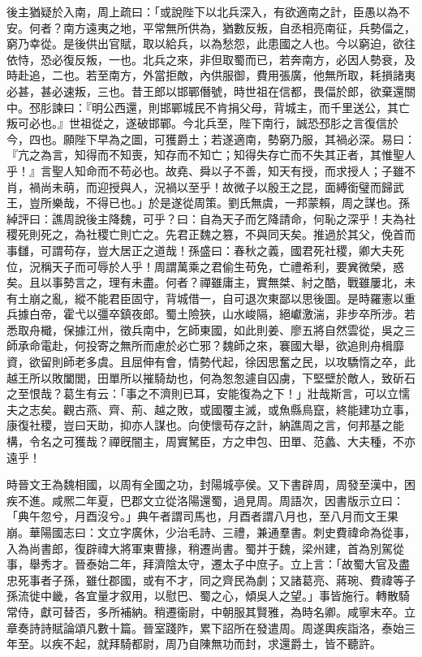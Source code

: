 \begin{pinyinscope}
後主猶疑於入南，周上疏曰：「或說陛下以北兵深入，有欲適南之計，臣愚以為不安。何者？南方遠夷之地，平常無所供為，猶數反叛，自丞相亮南征，兵勢偪之，窮乃幸從。是後供出官賦，取以給兵，以為愁怨，此患國之人也。今以窮迫，欲往依恃，恐必復反叛，一也。北兵之來，非但取蜀而已，若奔南方，必因人勢衰，及時赴追，二也。若至南方，外當拒敵，內供服御，費用張廣，他無所取，耗損諸夷必甚，甚必速叛，三也。昔王郎以邯鄲僭號，時世祖在信都，畏偪於郎，欲棄還關中。邳肜諫曰：『明公西還，則邯鄲城民不肯捐父母，背城主，而千里送公，其亡叛可必也。』世祖從之，遂破邯鄲。今北兵至，陛下南行，誠恐邳肜之言復信於今，四也。願陛下早為之圖，可獲爵土；若遂適南，勢窮乃服，其禍必深。易曰：『亢之為言，知得而不知喪，知存而不知亡；知得失存亡而不失其正者，其惟聖人乎！』言聖人知命而不苟必也。故堯、舜以子不善，知天有授，而求授人；子雖不肖，禍尚未萌，而迎授與人，況禍以至乎！故微子以殷王之昆，面縛銜璧而歸武王，豈所樂哉，不得已也。」於是遂從周策。劉氏無虞，一邦蒙賴，周之謀也。孫綽評曰：譙周說後主降魏，可乎？曰：自為天子而乞降請命，何恥之深乎！夫為社稷死則死之，為社稷亡則亡之。先君正魏之篡，不與同天矣。推過於其父，俛首而事讎，可謂苟存，豈大居正之道哉！孫盛曰：春秋之義，國君死社稷，卿大夫死位，況稱天子而可辱於人乎！周謂萬乘之君偷生苟免，亡禮希利，要兾微榮，惑矣。且以事勢言之，理有未盡。何者？禪雖庸主，實無桀、紂之酷，戰雖屢北，未有土崩之亂，縱不能君臣固守，背城借一，自可退次東鄙以思後圖。是時羅憲以重兵據白帝，霍弋以彊卒鎮夜郎。蜀土險狹，山水峻隔，絕巘激湍，非步卒所涉。若悉取舟檝，保據江州，徵兵南中，乞師東國，如此則姜、廖五將自然雲從，吳之三師承命電赴，何投寄之無所而慮於必亡邪？魏師之來，褰國大舉，欲追則舟楫靡資，欲留則師老多虞。且屈伸有會，情勢代起，徐因思奮之民，以攻驕惰之卒，此越王所以敗闔閭，田單所以摧騎劫也，何為怱怱遽自囚虜，下堅壁於敵人，致斫石之至恨哉？葛生有云：「事之不濟則已耳，安能復為之下！」壯哉斯言，可以立懦夫之志矣。觀古燕、齊、荊、越之敗，或國覆主滅，或魚縣鳥竄，終能建功立事，康復社稷，豈曰天助，抑亦人謀也。向使懷苟存之計，納譙周之言，何邦基之能構，令名之可獲哉？禪旣闇主，周實駑臣，方之申包、田單、范蠡、大夫種，不亦遠乎！

時晉文王為魏相國，以周有全國之功，封陽城亭侯。又下書辟周，周發至漢中，困疾不進。咸熈二年夏，巴郡文立從洛陽還蜀，過見周。周語次，因書版示立曰：「典午忽兮，月酉沒兮。」典午者謂司馬也，月酉者謂八月也，至八月而文王果崩。華陽國志曰：文立字廣休，少治毛詩、三禮，兼通羣書。刺史費禕命為從事，入為尚書郎，復辟禕大將軍東曹掾，稍遷尚書。蜀并于魏，梁州建，首為別駕從事，舉秀才。晉泰始二年，拜濟陰太守，遷太子中庶子。立上言：「故蜀大官及盡忠死事者子孫，雖仕郡國，或有不才，同之齊民為劇；又諸葛亮、蔣琬、費禕等子孫流徙中畿，各宜量才叙用，以慰巴、蜀之心，傾吳人之望。」事皆施行。轉散騎常侍，獻可替否，多所補納。稍遷衞尉，中朝服其賢雅，為時名卿。咸寧末卒。立章奏詩詩賦論頌凡數十篇。晉室踐阼，累下詔所在發遣周。周遂輿疾詣洛，泰始三年至。以疾不起，就拜騎都尉，周乃自陳無功而封，求還爵土，皆不聽許。


\end{pinyinscope}
